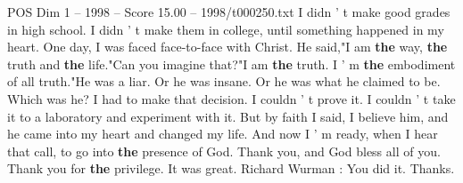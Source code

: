 \begin{textsample}{POS Dim 1 – 1998 – Score 15.00 – 1998/t000250.txt}
I didn ' t make good grades in high school.
I didn ' t make them in college, until something happened in my heart.
One day, I was faced face-to-face with Christ.
He said,"I am \textbf{the} way, \textbf{the} truth and \textbf{the} life."Can you imagine that?"I am \textbf{the} truth.
I ' m \textbf{the} embodiment of all truth."He was a liar.
Or he was insane.
Or he was what he claimed to be.
Which was he?
I had to make that decision.
I couldn ' t prove it.
I couldn ' t take it to a laboratory and experiment with it.
But by faith I said, I believe him, and he came into my heart and changed my life.
And now I ' m ready, when I hear that call, to go into \textbf{the} presence of God.
Thank you, and God bless all of you.
Thank you for \textbf{the} privilege.
It was great.
Richard Wurman : You did it.
Thanks.

\end{textsample}
